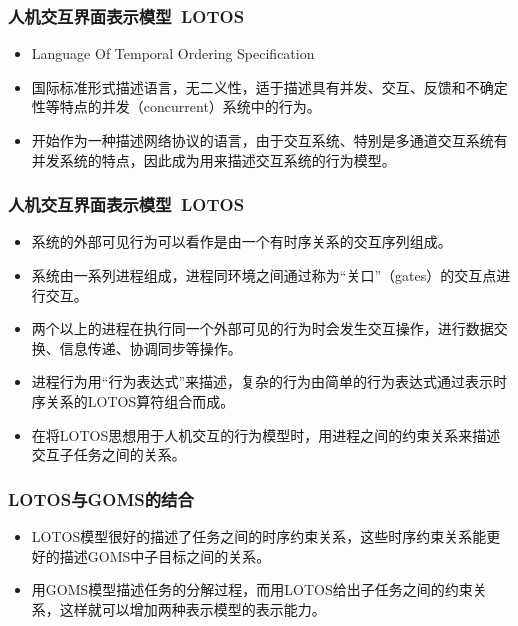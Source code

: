 \documentclass{beamer}
\begin{document}
\begin{frame}
	\frametitle{人机交互界面表示模型~{\small LOTOS}}
	\beamertemplatetransparentcovereddynamicmedium
	\begin{itemize}[<+->]
		\item Language Of Temporal Ordering Specification~\cite{bolognesi1987introduction}
		\item 国际标准形式描述语言，无二义性，适于描述具有并发、交互、反馈和不确定性等特点的并发（concurrent）系统中的行为。
		\item 开始作为一种描述网络协议的语言，由于交互系统、特别是多通道交互系统有并发系统的特点，因此成为用来描述交互系统的行为模型。
	\end{itemize}
\end{frame}

\begin{frame}
	\frametitle{人机交互界面表示模型~{\small LOTOS}}
	\beamertemplatetransparentcovereddynamicmedium
	\begin{itemize}[<+->]
		\item 系统的外部可见行为可以看作是由一个有时序关系的交互序列组成。
		\item 系统由一系列进程组成，进程同环境之间通过称为“关口”（gates）的交互点进行交互。
		\item 两个以上的进程在执行同一个外部可见的行为时会发生交互操作，进行数据交换、信息传递、协调同步等操作。
		\item 进程行为用“行为表达式”来描述，复杂的行为由简单的行为表达式通过表示时序关系的LOTOS算符组合而成。
		\item 在将LOTOS思想用于人机交互的行为模型时，用进程之间的约束关系来描述交互子任务之间的关系。 
	\end{itemize}
\end{frame}

\begin{frame}
	\frametitle{LOTOS与GOMS的结合}
	\beamertemplatetransparentcovereddynamicmedium
	\begin{itemize}[<+->]
		\item LOTOS模型很好的描述了任务之间的时序约束关系，这些时序约束关系能更好的描述GOMS中子目标之间的关系。
		\item 用GOMS模型描述任务的分解过程，而用LOTOS给出子任务之间的约束关系，这样就可以增加两种表示模型的表示能力。 
	\end{itemize}
\end{frame}
\end{document}
